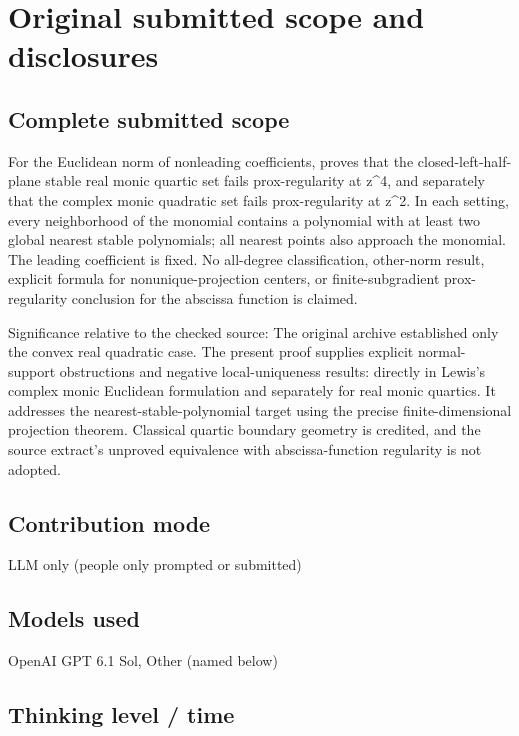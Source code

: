 \documentclass[11pt]{article}
\begin{document}
\section{Original submitted scope and disclosures}

\subsection{Complete submitted scope}

For the Euclidean norm of nonleading coefficients, proves that the closed-left-half-plane stable real monic quartic set fails prox-regularity at z\^{}4, and separately that the complex monic quadratic set fails prox-regularity at z\^{}2. In each setting, every neighborhood of the monomial contains a polynomial with at least two global nearest stable polynomials; all nearest points also approach the monomial. The leading coefficient is fixed. No all-degree classification, other-norm result, explicit formula for nonunique-projection centers, or finite-subgradient prox-regularity conclusion for the abscissa function is claimed.

Significance relative to the checked source: The original archive established only the convex real quadratic case. The present proof supplies explicit normal-support obstructions and negative local-uniqueness results: directly in Lewis's complex monic Euclidean formulation and separately for real monic quartics. It addresses the nearest-stable-polynomial target using the precise finite-dimensional projection theorem. Classical quartic boundary geometry is credited, and the source extract's unproved equivalence with abscissa-function regularity is not adopted.

\subsection{Contribution mode}

LLM only (people only prompted or submitted)

\subsection{Models used}

OpenAI GPT 6.1 Sol, Other (named below)

\subsection{Thinking level / time}
\end{document}
